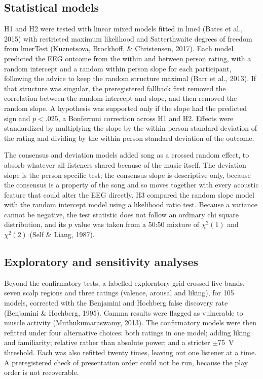 \documentclass[11pt,a4paper]{article}
\newcommand{\uV}{\textmu V}
\begin{document}
\subsection{Statistical models}

H1 and H2 were tested with linear mixed models fitted in lme4 (Bates et al., 2015) with restricted maximum likelihood and Satterthwaite degrees of freedom from lmerTest (Kuznetsova, Brockhoff, \& Christensen, 2017). Each model predicted the EEG outcome from the within and between person rating, with a random intercept and a random within person slope for each participant, following the advice to keep the random structure maximal (Barr et al., 2013). If that structure was singular, the preregistered fallback first removed the correlation between the random intercept and slope, and then removed the random slope. A hypothesis was supported only if the slope had the predicted sign and $p < .025$, a Bonferroni correction across H1 and H2. Effects were standardized by multiplying the slope by the within person standard deviation of the rating and dividing by the within person standard deviation of the outcome.

The consensus and deviation models added song as a crossed random effect, to absorb whatever all listeners shared because of the music itself. The deviation slope is the person specific test; the consensus slope is descriptive only, because the consensus is a property of the song and so moves together with every acoustic feature that could alter the EEG directly. H3 compared the random slope model with the random intercept model using a likelihood ratio test. Because a variance cannot be negative, the test statistic does not follow an ordinary chi square distribution, and its $p$ value was taken from a 50:50 mixture of $\chi^2(1)$ and $\chi^2(2)$ (Self \& Liang, 1987).

\subsection{Exploratory and sensitivity analyses}

Beyond the confirmatory tests, a labelled exploratory grid crossed five bands, seven scalp regions and three ratings (valence, arousal and liking), for 105 models, corrected with the Benjamini and Hochberg false discovery rate (Benjamini \& Hochberg, 1995). Gamma results were flagged as vulnerable to muscle activity (Muthukumaraswamy, 2013). The confirmatory models were then refitted under four alternative choices: both ratings in one model; adding liking and familiarity; relative rather than absolute power; and a stricter $\pm$75~\uV{} threshold. Each was also refitted twenty times, leaving out one listener at a time. A preregistered check of presentation order could not be run, because the play order is not recoverable.
\end{document}
